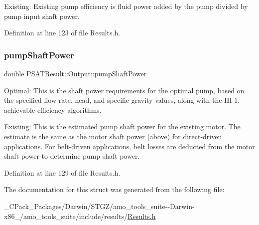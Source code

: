 Existing\+: Existing pump efficiency is fluid power added by the pump divided by pump input shaft power. 

Definition at line 123 of file Results.\+h.

\mbox{\label{struct_p_s_a_t_result_1_1_output_a4b3231e19e5c472035276f46826d5143}} 
\subsubsection{\texorpdfstring{pump\+Shaft\+Power}{pumpShaftPower}}
{\footnotesize\ttfamily double P\+S\+A\+T\+Result\+::\+Output\+::pump\+Shaft\+Power}



Optimal\+: This is the shaft power requirements for the optimal pump, based on the specified flow rate, head, and specific gravity values, along with the HI 1. achievable efficiency algorithms. 

Existing\+: This is the estimated pump shaft power for the existing motor. The estimate is the same as the motor shaft power (above) for direct-\/driven applications. For belt-\/driven applications, belt losses are deducted from the motor shaft power to determine pump shaft power. 

Definition at line 129 of file Results.\+h.



The documentation for this struct was generated from the following file\+:\begin{DoxyCompactItemize}
\item 
\+\_\+\+C\+Pack\+\_\+\+Packages/\+Darwin/\+S\+T\+G\+Z/amo\+\_\+tools\+\_\+suite-\/-\/\+Darwin-\/x86\+\_/amo\+\_\+tools\+\_\+suite/include/results/\hyperlink{___c_pack___packages_2_darwin_2_s_t_g_z_2amo__tools__suite--_darwin-x86__64_2amo__tools__suite_2include_2results_2_results_8h}{Results.\+h}\end{DoxyCompactItemize}
